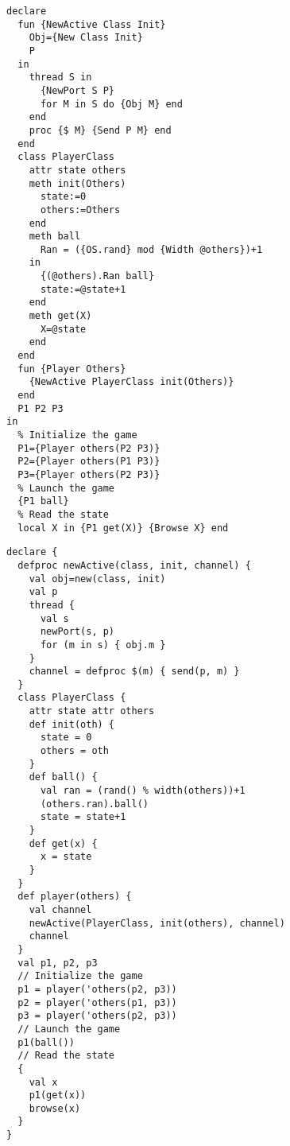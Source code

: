 \begin{lstlisting}[language=oz,label={lst:lstexampleobjoz},title={Ball playing : a program using active objects (\textit{Oz} version)}]
declare
  fun {NewActive Class Init}
    Obj={New Class Init}
    P
  in
    thread S in
      {NewPort S P}
      for M in S do {Obj M} end
    end
    proc {$ M} {Send P M} end
  end
  class PlayerClass
    attr state others
    meth init(Others)
      state:=0
      others:=Others
    end
    meth ball
      Ran = ({OS.rand} mod {Width @others})+1
    in
      {(@others).Ran ball}
      state:=@state+1
    end
    meth get(X)
      X=@state
    end
  end
  fun {Player Others}
    {NewActive PlayerClass init(Others)}
  end
  P1 P2 P3
in
  % Initialize the game
  P1={Player others(P2 P3)}
  P2={Player others(P1 P3)}
  P3={Player others(P2 P3)}
  % Launch the game
  {P1 ball}
  % Read the state
  local X in {P1 get(X)} {Browse X} end
\end{lstlisting}
\begin{lstlisting}[language=newoz,label={lst:lstexampleobjnewoz},title={Ball playing : a program using active objects (\textit{NewOz} version)}]
declare {
  defproc newActive(class, init, channel) {
    val obj=new(class, init)
    val p
    thread {
      val s
      newPort(s, p)
      for (m in s) { obj.m }
    }
    channel = defproc $(m) { send(p, m) }
  }
  class PlayerClass {
    attr state attr others
    def init(oth) {
      state = 0
      others = oth
    }
    def ball() {
      val ran = (rand() % width(others))+1
      (others.ran).ball()
      state = state+1
    }
    def get(x) {
      x = state
    }
  }
  def player(others) {
    val channel
    newActive(PlayerClass, init(others), channel)
    channel
  }
  val p1, p2, p3
  // Initialize the game
  p1 = player('others(p2, p3))
  p2 = player('others(p1, p3))
  p3 = player('others(p2, p3))
  // Launch the game
  p1(ball())
  // Read the state
  {
    val x
    p1(get(x))
    browse(x)
  }
}
\end{lstlisting}
